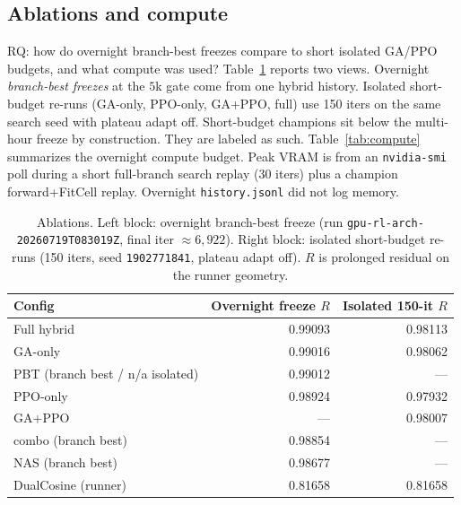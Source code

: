 \subsection{Ablations and compute}
\label{sec:ablation-compute}

RQ: how do overnight branch-best freezes compare to short isolated GA/PPO budgets, and what compute was used?
Table~\ref{tab:ablation} reports two views. Overnight \emph{branch-best freezes} at the $5$k gate come from one hybrid history. Isolated short-budget re-runs (GA-only, PPO-only, GA{+}PPO, full) use 150 iters on the same search seed with plateau adapt off.
Short-budget champions sit below the multi-hour freeze by construction. They are labeled as such.
Table~\ref{tab:compute} summarizes the overnight compute budget. Peak VRAM is from an \texttt{nvidia-smi} poll during a short full-branch search replay (30 iters) plus a champion forward{+}FitCell replay. Overnight \texttt{history.jsonl} did not log memory.

\begin{table}[t]
  \centering
  \caption{Ablations. Left block: overnight branch-best freeze (run \texttt{gpu-rl-arch-20260719T083019Z}, final iter $\approx 6{,}922$). Right block: isolated short-budget re-runs (150 iters, seed \texttt{1902771841}, plateau adapt off). $R$ is prolonged residual on the runner geometry.}
  \label{tab:ablation}
  \setlength{\tabcolsep}{3pt}
  \begin{tabular}{@{}lrr@{}}
    \toprule
    Config & Overnight freeze $R$ & Isolated 150-it $R$ \\
    \midrule
    Full hybrid & 0.99093 & 0.98113 \\
    GA-only & 0.99016 & 0.98062 \\
    PBT (branch best / n/a isolated) & 0.99012 & --- \\
    PPO-only & 0.98924 & 0.97932 \\
    GA{+}PPO & --- & 0.98007 \\
    combo (branch best) & 0.98854 & --- \\
    NAS (branch best) & 0.98677 & --- \\
    DualCosine (runner) & 0.81658 & 0.81658 \\
    \bottomrule
  \end{tabular}
\end{table}

